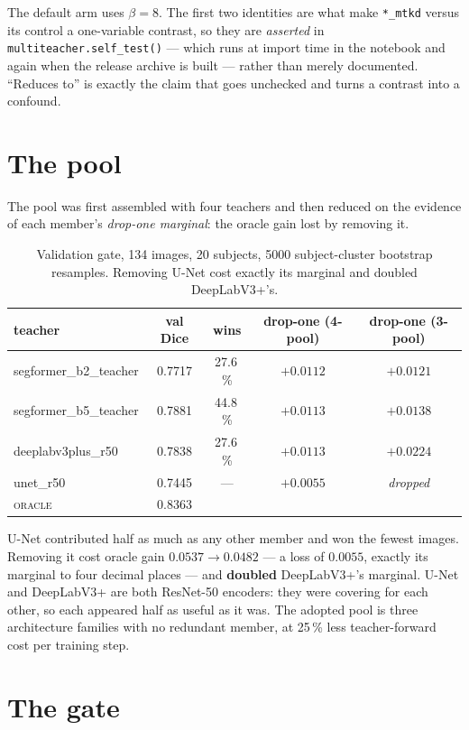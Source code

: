 \documentclass[11pt,a4paper]{article}
\newcommand{\bad}[1]{\textcolor{warn}{\textbf{#1}}}
\newcommand{\good}[1]{\textcolor{ok}{\textbf{#1}}}
\begin{document}
The default arm uses $\beta = 8$. The first two identities are what make
\texttt{*\_mtkd} versus its control a one-variable contrast, so they are
\emph{asserted} in \texttt{multiteacher.self\_test()} --- which runs at import
time in the notebook and again when the release archive is built --- rather than
merely documented. ``Reduces to'' is exactly the claim that goes unchecked and
turns a contrast into a confound.

\section{The pool}
\label{sec:pool}

The pool was first assembled with four teachers and then reduced on the evidence
of each member's \emph{drop-one marginal}: the oracle gain lost by removing it.

\begin{table}[h]
\centering
\small
\caption{Validation gate, 134 images, 20 subjects, 5000 subject-cluster bootstrap
resamples. Removing U-Net cost exactly its marginal and doubled DeepLabV3+'s.}
\label{tab:pool}
\begin{tabular}{lcccc}
\toprule
teacher & val Dice & wins & drop-one (4-pool) & drop-one (3-pool) \\
\midrule
segformer\_b2\_teacher & 0.7717 & 27.6\,\% & $+0.0112$ & $+0.0121$ \\
segformer\_b5\_teacher & 0.7881 & 44.8\,\% & $+0.0113$ & $+0.0138$ \\
deeplabv3plus\_r50     & 0.7838 & 27.6\,\% & $+0.0113$ & \good{$+0.0224$} \\
unet\_r50              & 0.7445 & --- & \bad{$+0.0055$} & \emph{dropped} \\
\midrule
\textsc{oracle} & 0.8363 & & & \\
\bottomrule
\end{tabular}
\end{table}

U-Net contributed half as much as any other member and won the fewest images.
Removing it cost oracle gain $0.0537 \to 0.0482$ --- a loss of $0.0055$, exactly
its marginal to four decimal places --- and \textbf{doubled} DeepLabV3+'s
marginal. U-Net and DeepLabV3+ are both ResNet-50 encoders: they were covering
for each other, so each appeared half as useful as it was. The adopted pool is
three architecture families with no redundant member, at 25\,\% less
teacher-forward cost per training step.

\section{The gate}
\label{sec:gate}
\end{document}
